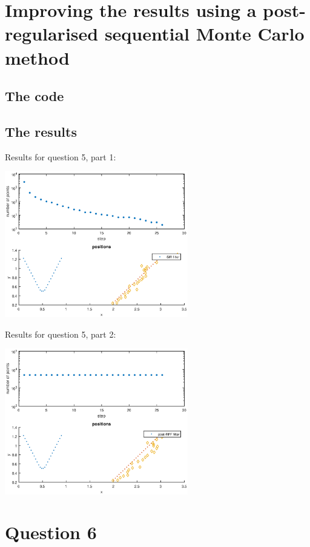 \documentclass[english,DIV=13]{scrartcl}
\begin{document}
\section{Improving the results using a post-regularised sequential
Monte Carlo method}
\subsection*{The code}

\subsection*{The results}
Results for question 5, part 1:
\begin{center}
   \includegraphics[width=0.6\textwidth]{img/q51.eps}
\end{center}

Results for question 5, part 2:
\begin{center}
   \includegraphics[width=0.6\textwidth]{img/q52.eps}
\end{center}

\section{Question 6}
\end{document}
